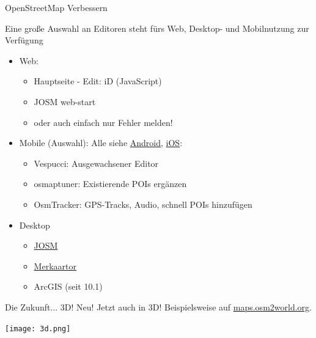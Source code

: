 \documentclass[handout]{beamer}
\begin{document}
\begin{frame}{OpenStreetMap Verbessern}

  Eine große Auswahl an Editoren steht fürs Web, Desktop- und Mobilnutzung zur Verfügung

  \begin{itemize}
    \item Web:
    \begin{itemize}
	    \item Hauptseite - Edit: iD (JavaScript)
      \item JOSM web-start
      \item oder auch einfach nur Fehler melden!
	      \pause
    \end{itemize}
    \item Mobile (Auswahl): Alle siehe  \href{http://wiki.openstreetmap.org/wiki/Android\#OpenStreetMap\_editing\_features}{Android}, \href{http://wiki.openstreetmap.org/wiki/Apple\_iOS\#OpenStreetMap\_editing\_features}{iOS}:
    \begin{itemize}
      \item Vespucci: Ausgewachsener Editor
      \item osmaptuner: Existierende POIs ergänzen
      \item OsmTracker: GPS-Tracks, Audio, schnell POIs hinzufügen
    \end{itemize}
  \item Desktop
    \begin{itemize}
      \item \href{http://josm.openstreetmap.de}{JOSM}
      \item \href{http://merkaartor.be}{Merkaartor}
      \item ArcGIS (seit 10.1)
    \end{itemize}
  \end{itemize}

\end{frame}



\begin{frame}{Die Zukunft... 3D! }
  Neu! Jetzt auch in 3D! Beispielsweise auf \href{http://maps.osm2world.org/?zoom=17&lat=47.06156&lon=15.46983&layers=BF0FTFFF}{maps.osm2world.org}.

  \texttt{[image: 3d.png]}


\end{frame}
\end{document}
